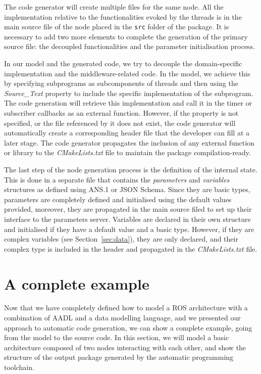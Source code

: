 The code generator will create multiple files for the same node. All the implementation relative to the functionalities evoked by the threads is in the main source file of the node placed in the \texttt{src} folder of the package. It is necessary to add two more elements to complete the generation of the primary source file: the decoupled functionalities and the parameter initialisation process.

In our model and the generated code, we try to decouple the domain-specific implementation and the middleware-related code. In the model, we achieve this by specifying subprograms as subcomponents of threads and then using the \textit{Source\_Text} property to include the specific implementation of the subprogram. The code generation will retrieve this implementation and call it in the timer or subscriber callbacks as an external function. However, if the property is not specified, or the file referenced by it does not exist, the code generator will automatically create a corresponding header file that the developer can fill at a later stage. The code generator propagates the inclusion of any external function or library to the \textit{CMakeLists.txt} file to maintain the package compilation-ready.

The last step of the node generation process is the definition of the internal state. This is done in a separate file that contains the \textit{parameters} and \textit{variables} structures as defined using ANS.1 or JSON Schema. Since they are basic types, parameters are completely defined and initialised using the default values provided, moreover, they are propagated in the main source filed to set up their interface to the parameters server. Variables are declared in their own structure and initialised if they have a default value and a basic type. However, if they are complex variables (see Section~\ref{sec:data}), they are only declared, and their complex type is included in the header and propagated in the \textit{CMakeLists.txt} file.

\section{A complete example}
Now that we have completely defined how to model a ROS architecture with a combination of AADL and a data modelling language, and we presented our approach to automatic code generation, we can show a complete example, going from the model to the source code. In this section, we will model a basic architecture composed of two nodes interacting with each other, and show the structure of the output package generated by the automatic programming toolchain.

